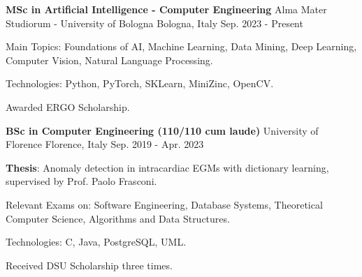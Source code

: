 
\begin{cventries}

  \vspace{0.3cm}
  \cventry
    {\textbf{MSc in Artificial Intelligence - Computer Engineering}}
    {Alma Mater Studiorum - University of Bologna\hspace{0.2cm}}
    {Bologna, Italy} %
    {Sep. 2023 - Present} %
    {
      \begin{cvitems} %
        \item {Main Topics: Foundations of AI, Machine Learning, Data Mining, Deep Learning, Computer Vision, Natural Language Processing.}
        \item {Technologies: Python, PyTorch, SKLearn, MiniZinc, OpenCV.}
        \item {Awarded ERGO Scholarship.}
      \end{cvitems}
    }

  \vspace{0.3cm} %

  \cventry
    {\textbf{BSc in Computer Engineering (110/110 cum laude)}} %
    {University of Florence \hspace{0.1cm} } %
    {Florence, Italy} %
    {Sep. 2019 - Apr. 2023} %
    {
      \begin{cvitems} %
        \item {\textbf{Thesis}: Anomaly detection in intracardiac EGMs with dictionary learning, supervised by Prof. Paolo Frasconi.}
        \item {Relevant Exams on: Software Engineering, Database Systems, Theoretical Computer Science, Algorithms and Data Structures.}
        \item {Technologies: C, Java, PostgreSQL, UML.}
        \item {Received DSU Scholarship three times.}
      \end{cvitems}
    }
  

\end{cventries}

